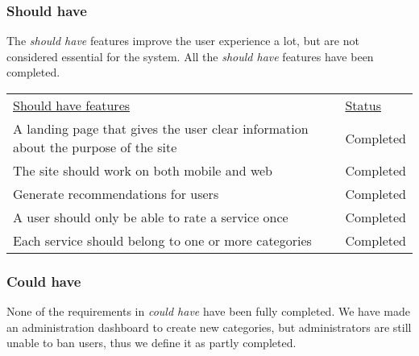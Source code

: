 \subsubsection{Should have}
The \textit{should have} features improve the user experience a lot, but are not considered essential for the system.
All the \textit{should have} features have been completed.

\begin{table}[H]
    \begin{tabularx}{\textwidth}{|X|l|}
    \underline{Should have features}                                                                 & \underline{Status} \\
    A landing page that gives the user clear information about the purpose of the site                & Completed \\
    The site should work on both mobile and web                                                       & Completed \\
    Generate recommendations for users                                                                & Completed \\
    A user should only be able to rate a service once                                                 & Completed \\
    Each service should belong to one or more categories                                              & Completed \\
   \end{tabularx}
\end{table}

\subsubsection{Could have}
None of the requirements in \textit{could have} have been fully completed.
We have made an administration dashboard to create new categories, but administrators are still unable to ban users, thus we define it as partly completed.

